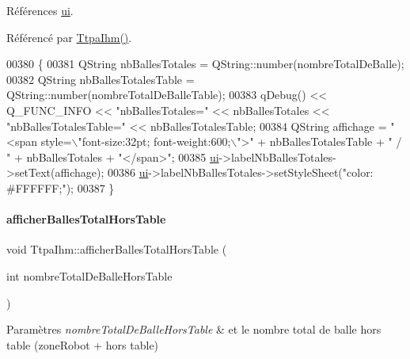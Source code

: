 Références \hyperlink{class_ttpa_ihm_ad5fae1222a667da158c26f3d0f0dce23}{ui}.



Référencé par \hyperlink{class_ttpa_ihm_ab3ed4b37a93ff04842414d4a98861d66}{Ttpa\+Ihm()}.


\begin{DoxyCode}
00380 \{
00381     QString nbBallesTotales = QString::number(nombreTotalDeBalle);
00382     QString nbBallesTotalesTable = QString::number(nombreTotalDeBalleTable);
00383     qDebug() << Q\_FUNC\_INFO << \textcolor{stringliteral}{"nbBallesTotales="} << nbBallesTotales  << \textcolor{stringliteral}{"nbBallesTotalesTable="} << 
      nbBallesTotalesTable;
00384     QString affichage = \textcolor{stringliteral}{"<span style=\(\backslash\)"font-size:32pt; font-weight:600;\(\backslash\)">"} + nbBallesTotalesTable + \textcolor{stringliteral}{" / "} 
      + nbBallesTotales + \textcolor{stringliteral}{"</span>"};
00385     \hyperlink{class_ttpa_ihm_ad5fae1222a667da158c26f3d0f0dce23}{ui}->labelNbBallesTotales->setText(affichage);
00386     \hyperlink{class_ttpa_ihm_ad5fae1222a667da158c26f3d0f0dce23}{ui}->labelNbBallesTotales->setStyleSheet(\textcolor{stringliteral}{"color: #FFFFFF;"});
00387 \}
\end{DoxyCode}
\mbox{\label{class_ttpa_ihm_a6102875b095d99c147e6a71a0dfbfb28}} 
\paragraph{\texorpdfstring{afficher\+Balles\+Total\+Hors\+Table}{afficherBallesTotalHorsTable}}
{\footnotesize\ttfamily void Ttpa\+Ihm\+::afficher\+Balles\+Total\+Hors\+Table (\begin{DoxyParamCaption}\item[{int}]{nombre\+Total\+De\+Balle\+Hors\+Table }\end{DoxyParamCaption})\hspace{0.3cm}{\ttfamily [slot]}}


\begin{DoxyParams}{Paramètres}
{\em nombre\+Total\+De\+Balle\+Hors\+Table} & et le nombre total de balle hors table (zone\+Robot + hors table) \\
\hline
\end{DoxyParams}


